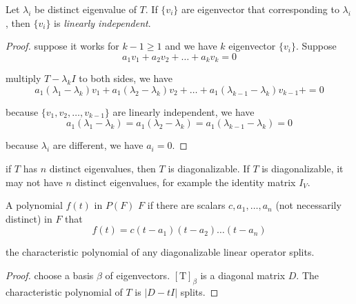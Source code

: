 \begin{theorem}
    Let ${\lambda_i}$ be distinct eigenvalue of $T$. If $\{v_i\}$ are eigenvector that corresponding to $\lambda_i$, then $\{v_i\}$ is \emph{linearly independent}.
\end{theorem}
\begin{proof}
    suppose it works for $k - 1 \geq 1$ and we have $k$ eigenvector $\{ v_i\}$. Suppose
    \begin{equation*}
        a_1 v_1 + a_2 v_2 + \dots + a_k v_k = 0
    \end{equation*}
    
    multiply $T - \lambda_k I$ to both sides, we have
    \begin{equation*}
        a_1(\lambda_1 - \lambda_k) v_1 + a_1(\lambda_2 - \lambda_k) v_2 +  \dots + a_1(\lambda_{k-1} - \lambda_k) v_{k-1} +  = 0
    \end{equation*}
    
    because $\{v_1, v_2, \dots, v_{k-1} \}$ are linearly independent, we have 
    \begin{equation*}
        a_1(\lambda_1 - \lambda_k) = a_1(\lambda_2 - \lambda_k) =  a_1(\lambda_{k-1} - \lambda_k) = 0
    \end{equation*}
    
    because $\lambda_i$ are different, we have $a_i = 0$.
\end{proof}

\begin{theorem}
    if $T$ has $n$ distinct eigenvalues, then $T$ is diagonalizable. If $T$ is diagonalizable, it may not have $n$ distinct eigenvalues, for example the identity matrix $I_V$.
\end{theorem}

\begin{definition}
    A polynomial $f(t)$ in $P(F)$  $F$ if there are scalars $c, a_1, \dots, a_n$ (not necessarily distinct) in $F$ that
    \begin{equation*}
        f(t) = c(t - a_1)(t - a_2) \dots (t-a_n)
    \end{equation*}
\end{definition}

\begin{theorem}
    the characteristic polynomial of any diagonalizable linear operator splits.
\end{theorem}

\begin{proof}
    choose a basis $\beta$ of eigenvectors. $[\mathrm{T}]_\beta$ is a diagonal matrix $D$. The characteristic polynomial of $T$ is $|D - tI|$ splits.
\end{proof}

